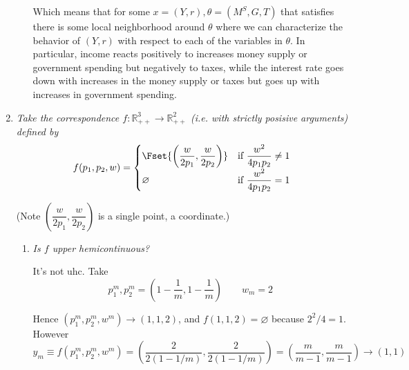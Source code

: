 \documentclass{article}
\begin{document}
\begin{enumerate}[1.]
\begin{enumerate}[a)]
      Which means that for some $x = (Y, r), \theta = (M^S, G, T)$ that satisfies  there is some local neighborhood around $\theta$ where we can characterize the behavior of $(Y, r)$ with respect to each of the variables in $\theta$. In particular, income reacts positively to increases money supply or government spending but negatively to taxes, while the interest rate goes down with increases in the money supply or taxes but goes up with increases in government spending.
    \end{enumerate}

  \item {\itshape
    Take the correspondence $f: \mathbb{R}^3_{++} \to \mathbb{R}^2_{++}$ (i.e. with strictly posisive arguments) defined by
    \[
      f(p_1, p_2, w)
      =
      \begin{cases}
        \Fset{
          \left(\dfrac{w}{2p_1}, \dfrac{w}{2 p_2}\right)
        }
          & \text{if } \dfrac{w^2}{4 p_1 p_2} \ne 1 \\[6pt]
        \varnothing
          & \text{if } \dfrac{w^2}{4 p_1 p_2} = 1
      \end{cases}
    \]

    (Note $\left(\dfrac{w}{2p_1}, \dfrac{w}{2 p_2}\right)$ is a single point, a coordinate.)}


    \solution

    \begin{enumerate}
      \item \textit{Is $f$ upper hemicontinuous?}

        \solution It's not uhc. Take
        \[
          p^m_1, p^m_2
          =
          \left(
            1 - \dfrac{1}{m},
            1 - \dfrac{1}{m}
          \right)
          \quad\quad
          w_m = 2
        \]

        Hence $(p^m_1, p^m_2, w^m) \to (1, 1, 2)$, and $f(1, 1, 2) = \varnothing$ because $2^2 / 4 = 1$. However
        \[
          y_m
          \equiv
          f(p^m_1, p^m_2, w^m)
          =
          \left(\dfrac{2}{2 (1 - 1 / m)}, \dfrac{2}{2 (1 - 1 / m)}\right)
          =
          \left(\dfrac{m}{m - 1}, \dfrac{m}{m - 1}\right)
          \to
          (1, 1)
        \]


\end{enumerate}
\end{enumerate}
\end{document}
